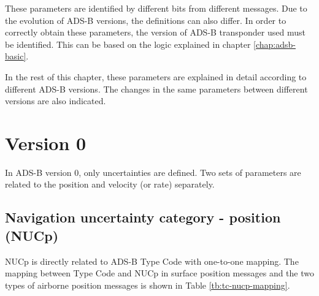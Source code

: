 These parameters are identified by different bits from different messages. Due to the evolution of ADS-B versions, the definitions can also differ. In order to correctly obtain these parameters, the version of ADS-B transponder used must be identified. This can be based on the logic explained in chapter \ref{chap:adsb-basic}.

In the rest of this chapter, these parameters are explained in detail according to different ADS-B versions. The changes in the same parameters between different versions are also indicated.


\section{Version 0}

In ADS-B version 0, only uncertainties are defined. Two sets of parameters are related to the position and velocity (or rate) separately.

\subsection{Navigation uncertainty category - position (NUCp)}

NUCp is directly related to ADS-B Type Code with one-to-one mapping. The mapping between Type Code and NUCp in surface position messages and the two types of airborne position messages is shown in Table \ref{tb:tc-nucp-mapping}.


